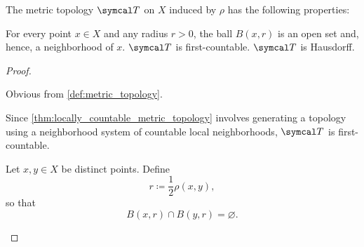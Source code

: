 \begin{proposition}\label{thm:metric_topology_properties}
  The metric topology \( \Cal{T} \) on \( X \) induced by \( \rho \) has the following properties:
  \begin{defenum}
     For every point \( x \in X \) and any radius \( r > 0 \), the ball \( B(x, r) \) is an open set and, hence, a neighborhood of \( x \).
     \( \Cal{T} \) is first-countable.
     \( \Cal{T} \) is Hausdorff.
  \end{defenum}
\end{proposition}
\begin{proof}
  \begin{description}
     Obvious from \cref{def:metric_topology}.

     Since \cref{thm:locally_countable_metric_topology} involves generating a topology using a neighborhood system of countable local neighborhoods, \( \Cal{T} \) is first-countable.

     Let \( x, y \in X \) be distinct points. Define
    \begin{equation*}
      r \coloneqq \dfrac 1 2 \rho(x, y),
    \end{equation*}
    so that
    \begin{equation*}
      B(x, r) \cap B(y, r) = \varnothing.
    \end{equation*}
  \end{description}
\end{proof}


